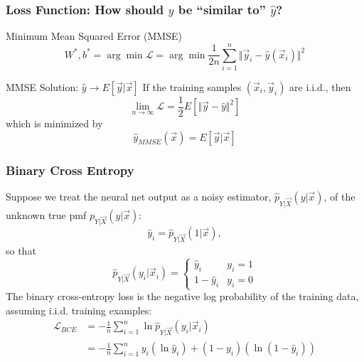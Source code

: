 \documentclass{beamer}
\begin{document}
\begin{frame}
  \frametitle{Loss Function: How should $y$ be
    ``similar to'' $\hat{y}$?}
  \begin{block}{Minimum Mean Squared Error (MMSE)}
    \[
    W^*,b^*=\arg\min {\mathcal L} = \arg\min\frac{1}{2n}\sum_{i=1}^n
    \Vert\vec{y}_{i}-\hat{y}(\vec{x}_i)\Vert^2
    \]
  \end{block}
  \begin{block}{MMSE Solution: $\hat{y}\rightarrow E\left[\vec{y}|\vec{x}\right]$}
    If the training samples $(\vec{x}_i,\vec{y}_i)$ are i.i.d., then
    \[
    \lim_{n\rightarrow\infty}{\mathcal L} = \frac{1}{2}E\left[\Vert\vec{y}-\hat{y}\Vert^2\right]
    \]
    which is minimized by
    \[
    \hat{y}_{MMSE}(\vec{x})=E\left[\vec{y}|\vec{x}\right]
    \]
  \end{block}
\end{frame}

\begin{frame}
  \frametitle{Binary Cross Entropy}

  Suppose we treat the neural net output as a noisy
  estimator, $\hat{p}_{Y|\vec{X}}(y|\vec{x})$, of the unknown true pmf
  $p_{Y|\vec{X}}\left(y|\vec{x}\right)$:
  \[
  \hat{y}_i = \hat{p}_{Y|\vec{X}}(1|\vec{x}),
  \]
  so that
  \begin{displaymath}
    \hat{p}_{Y|\vec{X}}(y_i|\vec{x}_i)
    =\begin{cases}\hat{y}_i & y_i=1\\1-\hat{y}_i & y_i=0\end{cases}
  \end{displaymath}
  The binary cross-entropy loss is the negative log probability of the
  training data, assuming i.i.d. training examples:
  \begin{align*}
    {\mathcal L}_{BCE} &= -\frac{1}{n}\sum_{i=1}^n \ln\hat{p}_{Y|\vec{X}}(y_i|\vec{x}_i)\\
    &= -\frac{1}{n}\sum_{i=1}^n
    y_i\left(\ln\hat{y}_i\right)+
    (1-y_i)\left(\ln(1-\hat{y}_i)\right)
  \end{align*}
\end{frame}
\end{document}
